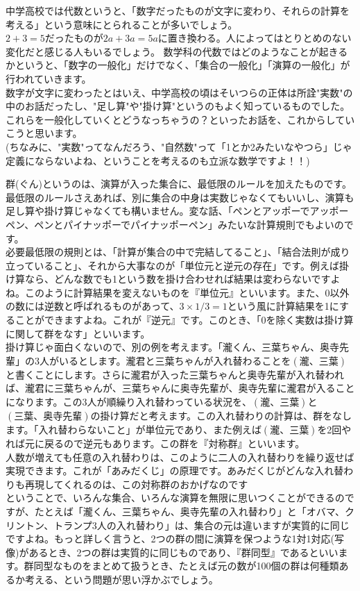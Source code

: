 中学高校では代数というと、「数字だったものが文字に変わり、それらの計算を考える」という意味にとられることが多いでしょう。\\
$2 + 3 = 5$だったものが$2a + 3a = 5a$に置き換わる。人によってはとりとめのない変化だと感じる人もいるでしょう。
数学科の代数ではどのようなことが起きるかというと、「数字の一般化」だけでなく、「集合の一般化」「演算の一般化」が行われていきます。\\
数字が文字に変わったとはいえ、中学高校の頃はそいつらの正体は所詮"実数"の中のお話だったし、"足し算"や"掛け算"というのもよく知っているものでした。これらを一般化していくとどうなっちゃうの？といったお話を、これからしていこうと思います。\\
(ちなみに、"実数"ってなんだろう、"自然数"って「1とか2みたいなやつら」じゃ定義にならないよね、ということを考えるのも立派な数学ですよ！！)

群(ぐん)というのは、演算が入った集合に、最低限のルールを加えたものです。\\
最低限のルールさえあれば、別に集合の中身は実数じゃなくてもいいし、演算も足し算や掛け算じゃなくても構いません。変な話、「ペンとアッポーでアッポーペン、ペンとパイナッポーでパイナッポーペン」みたいな計算規則でもよいのです。\\
必要最低限の規則とは、「計算が集合の中で完結してること」、「結合法則が成り立っていること」、それから大事なのが「単位元と逆元の存在」です。例えば掛け算なら、どんな数でも1という数を掛け合わせれば結果は変わらないですよね。このように計算結果を変えないものを『単位元』といいます。また、0以外の数には逆数と呼ばれるものがあって、$3 × 1/3 = 1$という風に計算結果を1にすることができますよね。これが『逆元』です。このとき、「0を除く実数は掛け算に関して群をなす」といいます。\\
掛け算じゃ面白くないので、別の例を考えます。「瀧くん、三葉ちゃん、奥寺先輩」の3人がいるとします。瀧君と三葉ちゃんが入れ替わることを$(瀧、三葉)$と書くことにします。さらに瀧君が入った三葉ちゃんと奥寺先輩が入れ替われば、瀧君に三葉ちゃんが、三葉ちゃんに奥寺先輩が、奥寺先輩に瀧君が入ることになります。この3人が順繰り入れ替わっている状況を、$(瀧、三葉)$と$(三葉、奥寺先輩)$の掛け算だと考えます。この入れ替わりの計算は、群をなします。「入れ替わらないこと」が単位元であり、また例えば$(瀧、三葉)$を2回やれば元に戻るので逆元もあります。この群を『対称群』といいます。\\
人数が増えても任意の入れ替わりは、このように二人の入れ替わりを繰り返せば実現できます。これが「あみだくじ」の原理です。あみだくじがどんな入れ替わりも再現してくれるのは、この対称群のおかげなのです\\
ということで、いろんな集合、いろんな演算を無限に思いつくことができるのですが、たとえば「瀧くん、三葉ちゃん、奥寺先輩の入れ替わり」と「オバマ、クリントン、トランプ3人の入れ替わり」は、集合の元は違いますが実質的に同じですよね。もっと詳しく言うと、2つの群の間に演算を保つような1対1対応(写像)があるとき、2つの群は実質的に同じものであり、『群同型』であるといいます。群同型なものをまとめて扱うとき、たとえば元の数が100個の群は何種類あるか考える、という問題が思い浮かぶでしょう。


